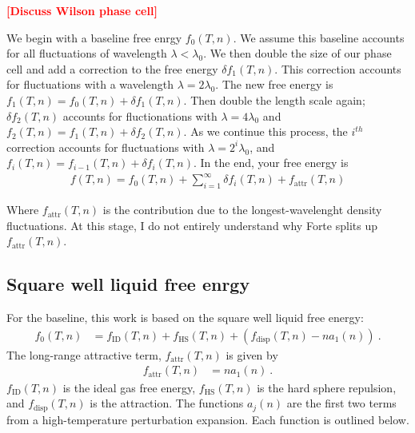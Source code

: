 \documentclass[letterpaper,twocolumn,amsmath,amssymb,prb]{revtex4-1}
\newcommand{\kT}{\ensuremath{k_BT}}
\newcommand{\fid}{\ensuremath{f_\text{ID}(T,n)}}
\newcommand{\fhs}{\ensuremath{f_\text{HS}(T,n)}}
\newcommand{\fdisp}{\ensuremath{f_\text{disp}(T,n)}}
\newcommand{\fattr}{\ensuremath{f_\text{attr}(T,n)}}
\newcommand{\1}{\ensuremath{\textbf{r}_1}}
\newcommand{\2}{\ensuremath{\textbf{r}_2}}
\newcommand{\fixme}[1]{\textcolor{red}{\textbf{[#1]}}}
\begin{document}
\fixme{Discuss Wilson phase cell}

We begin with a baseline free enrgy $f_0(T,n)$. We assume this baseline accounts for all fluctuations of wavelength $\lambda < \lambda_0$. We then double the size of our phase cell and add a correction to the free energy $\delta f_1(T,n)$. This correction accounts for fluctuations with a wavelength $\lambda = 2\lambda_0$. The new free energy is $f_1(T,n) = f_0(T,n) + \delta f_1(T,n)$. Then double the length scale again; $\delta f_2(T,n)$ accounts for fluctionations with $\lambda = 4\lambda_0$ and $f_2(T,n) = f_1(T,n) + \delta f_2(T,n)$. As we continue this process, the $i^{th}$ correction accounts for fluctuations with $\lambda = 2^i\lambda_0$, and $f_i(T,n) = f_{i-1}(T,n) + \delta f_i(T,n)$. In the end, your free energy is
\begin{align}
  f(T,n) = f_0(T,n) + \sum_{i=1}^\infty\delta f_i(T,n) + \fattr
\end{align}

Where $\fattr$ is the contribution due to the longest-wavelenght density fluctuations. At this stage, I do not entirely understand why Forte splits up $\fattr$.



\subsection{Square well liquid free enrgy}\label{subsec:SW}
For the baseline, this work is based on the square well liquid free energy\cite{Hughes13}:
\begin{align}
  f_0(T,n) &= \fid + \fhs + \left( \fdisp - n a_1(n) \right) \ .
\end{align}
The long-range attractive term, $\fattr$ is given by
\begin{align}
  \fattr &= n a_1(n) \ .
\end{align}
$\fid$ is the ideal gas free energy, $\fhs$ is the hard sphere repulsion, and $\fdisp$ is the attraction. The functions $a_j(n)$ are the first two terms from a high-temperature perturbation expansion. Each function is outlined below.
\end{document}
